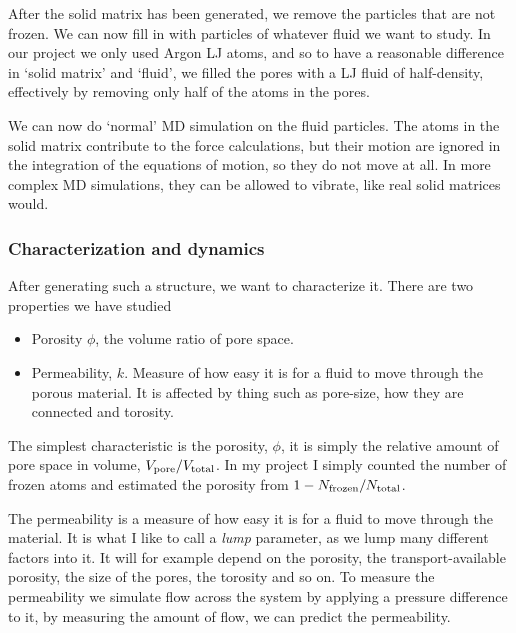 \documentclass[a4paper, 11pt, notitlepage, english]{article}
\begin{document}
After the solid matrix has been generated, we remove the particles that are not frozen. We can now fill in with particles of whatever fluid we want to study. In our project we only used Argon LJ atoms, and so to have a reasonable difference in `solid matrix' and `fluid', we filled the pores with a LJ fluid of half-density, effectively by removing only half of the atoms in the pores.

We can now do `normal' MD simulation on the fluid particles. The atoms in the solid matrix contribute to the force calculations, but their motion are ignored in the integration of the equations of motion, so they do not move at all. In more complex MD simulations, they can be allowed to vibrate, like real solid matrices would.

\subsubsection*{Characterization and dynamics}

After generating such a structure, we want to characterize it. There are two properties we have studied
\begin{itemize}
	\item Porosity $\phi$, the volume ratio of pore space. 
	\item Permeability, $k$. Measure of how easy it is for a fluid to move through the porous material. It is affected by thing such as pore-size, how they are connected and torosity.
\end{itemize}

The simplest characteristic is the porosity, $\phi$, it is simply the relative amount of pore space in volume, $V_{\rm pore}/V_{\rm total}$. In my project I simply counted the number of frozen atoms and estimated the porosity from $1 - N_{\rm frozen}/N_{\rm total}$.

The permeability is a measure of how easy it is for a fluid to move through the material. It is what I like to call a \emph{lump} parameter, as we lump many different factors into it. It will for example depend on the porosity, the transport-available porosity, the size of the pores, the torosity and so on. To measure the permeability we simulate flow across the system by applying a pressure difference to it, by measuring the amount of flow, we can predict the permeability.
\end{document}
